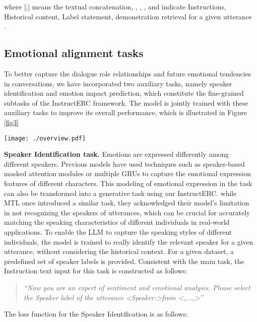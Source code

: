 \documentclass[conference]{IEEEtran}
\begin{document}
where [;] means the textual concatenation, , , , and  indicate Instructions, Historical content, Label statement, demonstration retrieval for a given utterance . 


\subsection{Emotional alignment tasks}
To better capture the dialogue role relationships and future emotional tendencies in conversations, we have incorporated two auxiliary tasks, namely speaker identification and emotion impact prediction, which constitute the fine-grained subtasks of the InstructERC framework. The model is jointly trained with these auxiliary tasks to improve its overall performance, which is illustrated in Figure \ref{fig3}

\begin{figure*}[t]
\centering
\texttt{[image: ./overview.pdf]} \vspace{-0.1cm}
\caption{The overview of InstructERC framework}
\label{fig3}
\vspace{-0.122cm}
\end{figure*}

\textbf{Speaker Identification task.}
Emotions are expressed differently among different speakers. Previous models have used techniques such as speaker-based masked attention modules or multiple GRUs to capture the emotional expression features of different characters. This modeling of emotional expression in the task can also be transformed into a generative task using our InstructERC. while MTL \cite{li2020multi} once
introduced a similar task, they acknowledged their model's limitation in not recognizing the speakers of utterances, which can be crucial for accurately matching the speaking characteristics of different individuals in real-world applications.
To enable the LLM to capture the speaking styles of different individuals, the model is trained to really identify the relevant speaker for a given utterance, without considering the historical context. For a given dataset, a predefined set of speaker labels is provided. Consistent with the main task, the Instruction text input  for this task is constructed as follows:
\begin{quote}
\textit{``Now you are an expert of sentiment and emotional analysis. Please select the Speaker label of the utterance \textless Speaker:\textgreater\quad from \quad\textless,...,\textgreater''}
\end{quote}
The loss function for the Speaker Identification is as follows:
\end{document}
